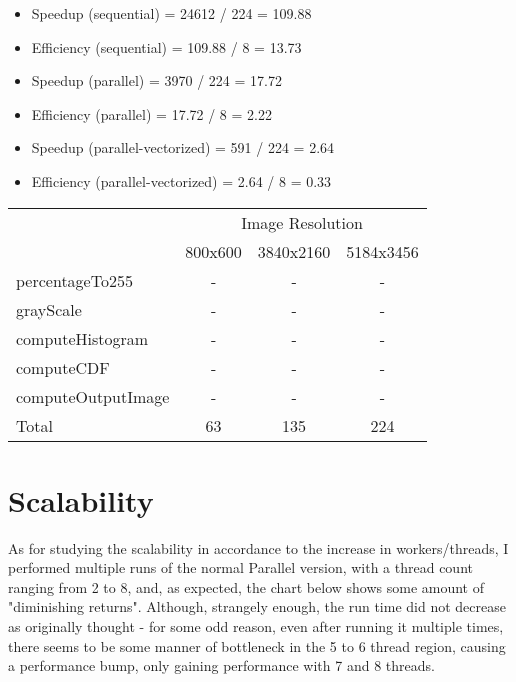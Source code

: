 \documentclass[sigconf]{acmart}
\begin{document}
\begin{itemize}
    \item Speedup (sequential) = 24612 / 224 = 109.88
    \item Efficiency (sequential) = 109.88 / 8 = 13.73
    \item Speedup (parallel) = 3970 / 224 = 17.72
    \item Efficiency (parallel) = 17.72 / 8 = 2.22
    \item Speedup (parallel-vectorized) = 591 / 224 = 2.64
    \item Efficiency (parallel-vectorized) = 2.64 / 8 = 0.33
\end{itemize}

\begin{table}[H]
\begin{tabular}{|lccc|}
\hline
\multicolumn{1}{|c}{} & \multicolumn{3}{c|}{Image Resolution} \\
                      & 800x600   & 3840x2160   & 5184x3456   \\
percentageTo255       & -         & -           & -           \\
grayScale             & -         & -           & -           \\
computeHistogram      & -         & -           & -           \\
computeCDF            & -         & -           & -           \\
computeOutputImage    & -         & -           & -           \\
Total                 & 63        & 135         & 224         \\ \hline
\end{tabular}
\end{table}

\section{Scalability}

As for studying the scalability in accordance to the increase in workers/threads, I performed multiple runs of the normal Parallel version, with a thread count ranging from 2 to 8, and, as expected, the chart below shows some amount of "diminishing returns". Although, strangely enough, the run time did not decrease as originally thought - for some odd reason, even after running it multiple times, there seems to be some manner of bottleneck in the 5 to 6 thread region, causing a performance bump, only gaining performance with 7 and 8 threads.\\
\end{document}
